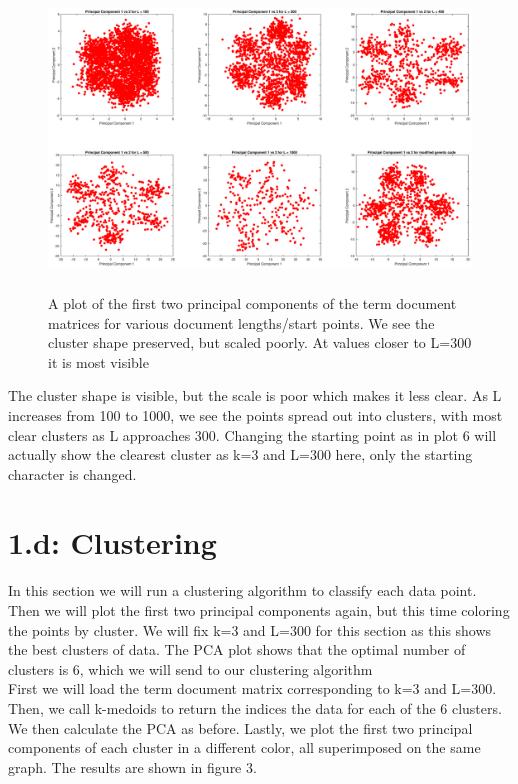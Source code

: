\documentclass{article}
\begin{document}
\begin{figure}[H]
    \centerline
    {
    \includegraphics[width=17.5cm, height=8cm]{c_L_vary}
    }
    \caption{\label{fig:my figure} A plot of the first two principal components of the term document matrices for various document lengths/start points. We see the cluster shape preserved, but scaled poorly.  At values closer to L=300 it is most visible}
\end{figure}

The cluster shape is visible, but the scale is poor which makes it less clear.  As L increases from 100 to 1000, we see the points spread out into clusters, with most clear clusters as L approaches 300.  Changing the starting point as in plot 6 will actually show the clearest cluster as k=3 and L=300 here, only the starting character is changed.  

\section*{1.d: Clustering}

In this section we will run a clustering algorithm to classify each data point. Then we will plot the first two principal components again, but this time coloring the points by cluster.  We will fix k=3 and L=300 for this section as this shows the best clusters of data. The PCA plot shows that the optimal number of clusters is 6, which we will send to our clustering algorithm 
\\
First we will load the term document matrix corresponding to k=3 and L=300.  Then, we call k-medoids to return the indices the data for each of the 6 clusters.  We then calculate the PCA as before.  Lastly, we plot the first two principal components of each cluster in a different color, all superimposed on the same graph.  The results are shown in figure 3.
\end{document}
